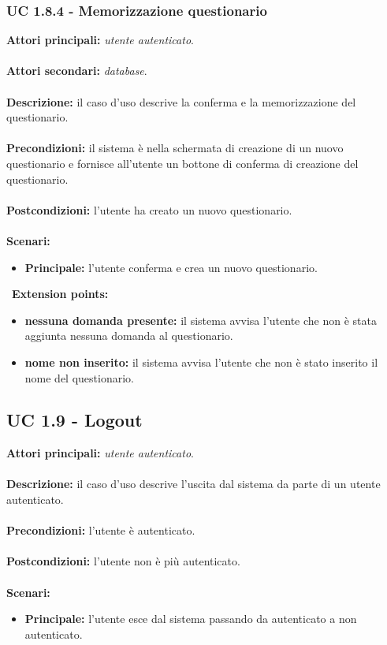 \documentclass[a4paper,11pt]{article}
\begin{document}
\subsubsection{UC 1.8.4 - Memorizzazione questionario}

\textbf{Attori principali:} \textit{utente autenticato}.\\
\\
\textbf{Attori secondari:} \textit{database}.\\
\\
\textbf{Descrizione:} il caso d'uso descrive la conferma e la memorizzazione del questionario. \\
\\
\textbf{Precondizioni:} il sistema è nella schermata di creazione di un nuovo questionario e fornisce all'utente un bottone di conferma di creazione del questionario.\\
\\
\textbf{Postcondizioni:} l'utente ha creato un nuovo questionario. \\
\\
\textbf{Scenari:}
\begin{itemize}
\item \textbf{Principale:} l'utente conferma e crea un nuovo questionario.
\end{itemize}
\
\textbf{Extension points:}
\begin{itemize}
\item \textbf{nessuna domanda presente:} il sistema avvisa l'utente che non è stata aggiunta nessuna domanda al questionario.
\item \textbf{nome non inserito:} il sistema avvisa l'utente che non è stato inserito il nome del questionario.
\end{itemize}

\subsection{UC 1.9 - Logout}

\textbf{Attori principali:} \textit{utente autenticato}.\\
\\
\textbf{Descrizione:} il caso d'uso descrive l'uscita dal sistema da parte di un utente autenticato. \\
\\
\textbf{Precondizioni:} l'utente è autenticato. \\
\\
\textbf{Postcondizioni:} l'utente non è più autenticato. \\
\\
\textbf{Scenari:}
\begin{itemize}
\item \textbf{Principale:} l'utente esce dal sistema passando da autenticato a non autenticato.

\end{itemize}
	
\end{document}
